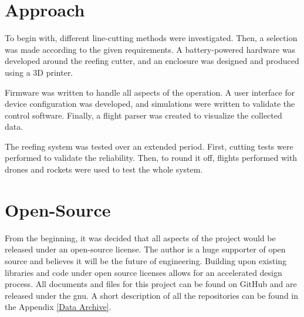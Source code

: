\section{Approach}
To begin with, different line-cutting methods were investigated. Then, a selection was made according to the given requirements. A battery-powered hardware was developed around the reefing cutter, and an enclosure was designed and produced using a 3D printer. 

Firmware was written to handle all aspects of the operation. A user interface for device configuration was developed, and simulations were written to validate the control software. Finally, a flight parser was created to visualize the collected data.

The reefing system was tested over an extended period. First, cutting tests were performed to validate the reliability. Then, to round it off, flights performed with drones and rockets were used to test the whole system. 

\section{Open-Source}
From the beginning, it was decided that all aspects of the project would be released under an open-source license. The author is a huge supporter of open source and believes it will be the future of engineering. Building upon existing libraries and code under open source licenses allows for an accelerated design process. All documents and files for this project can be found on GitHub and are released under the \gls{gnu}. A short description of all the repositories can be found in the Appendix \ref{Data Archive}.
